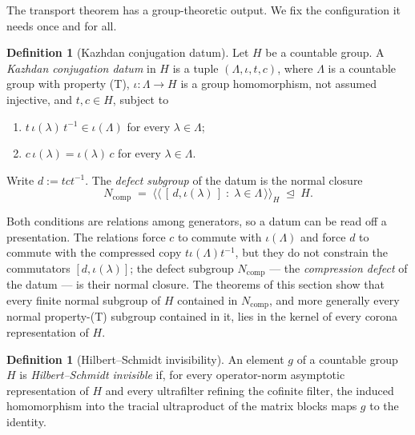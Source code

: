 \documentclass[11pt]{amsart}
\newcommand{\leanverified}[2]{\ignorespaces}
\theoremstyle{definition}
\newtheorem{definition}[theorem]{Definition}
\theoremstyle{remark}
\theoremstyle{plain}
\begin{document}
The transport theorem has a group-theoretic output.  We fix the
configuration it needs once and for all.

\begin{definition}[Kazhdan conjugation datum]\label{def:pattern}
Let $H$ be a countable group.  A \emph{Kazhdan conjugation datum} in $H$
is a tuple $(\Lambda,\iota,t,c)$, where $\Lambda$ is a countable
group with property (T), $\iota\colon\Lambda\to H$ is a group
homomorphism, not assumed injective, and $t,c\in H$,
subject to
\begin{enumerate}
  \item[(M1)] $t\,\iota(\lambda)\,t^{-1}\in\iota(\Lambda)$ for every
    $\lambda\in\Lambda$;
  \item[(M2)] $c\,\iota(\lambda)=\iota(\lambda)\,c$ for every
    $\lambda\in\Lambda$.
\end{enumerate}
Write $d:=tct^{-1}$.  The \emph{defect subgroup} of the
datum is the normal closure
\leanverified{Sofic/ManuscriptExactWrappers}{GroupApproximation.ManuscriptExactWrappers.manuscriptMarkedKazhdanPattern}
\[
  N_{\mathrm{comp}}
  \;=\;\bigl\langle\!\bigl\langle\,
  [\,d,\iota(\lambda)\,]\;:\;\lambda\in\Lambda
  \,\bigr\rangle\!\bigr\rangle_H\;\trianglelefteq\;H .
\]
\end{definition}

Both conditions are relations among generators, so a datum can be read
off a presentation.  The relations force $c$ to commute with
$\iota(\Lambda)$ and force $d$ to commute with the compressed copy
$t\iota(\Lambda)t^{-1}$, but they do not constrain the commutators
$[d,\iota(\lambda)]$; the defect subgroup $N_{\mathrm{comp}}$ --- the
\emph{compression defect} of the datum --- is their normal closure.
The theorems of this section show that every finite normal subgroup of
$H$ contained in $N_{\mathrm{comp}}$, and more generally every normal
property-\textup{(T)} subgroup contained in it, lies in the kernel of
every corona representation of $H$.

\begin{definition}[Hilbert--Schmidt invisibility]\label{def:invisible}
An element $g$ of a countable group $H$ is \emph{Hilbert--Schmidt
invisible} if, for every operator-norm asymptotic representation of
$H$ and every ultrafilter refining the cofinite filter, the induced
homomorphism into the tracial ultraproduct of the matrix blocks maps
$g$ to the identity.
\leanverified{Sofic/ManuscriptExactWrappers}{GroupApproximation.ManuscriptExactWrappers.ManuscriptHSInvisible}
\end{definition}
\end{document}
